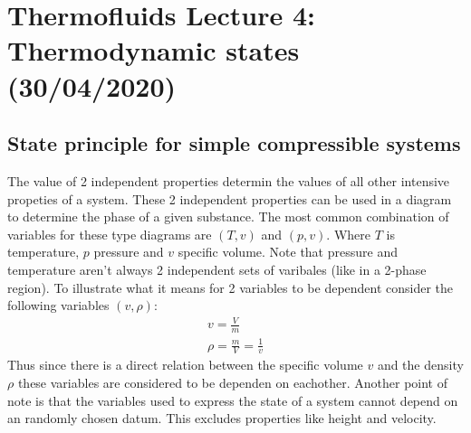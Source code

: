 \documentclass[11pt, a4paper]{article}
\begin{document}
\setcounter{section}{3}
\setcounter{equation}{0}
\section{Thermofluids Lecture 4: Thermodynamic states (30/04/2020)}


\subsection{State principle for simple compressible systems}
The value of 2 independent properties determin the values of all other intensive propeties of a system. These 2 independent properties can be used in a diagram to determine the phase of a given substance. The most common combination of variables for these type diagrams are $(T, v)$ and $(p, v)$. Where $T$ is temperature, $p$ pressure and $v$ specific volume. Note that pressure and temperature aren't always 2 independent sets of varibales (like in a 2-phase region). To illustrate what it means for 2 variables to be dependent consider the following variables $(v, \rho)$:
\begin{gather}
  v = \frac{V}{m}\\
  \rho = \frac{m}{V} = \frac{1}{v}
\end{gather}
Thus since there is a direct relation between the specific volume $v$ and the density $\rho$ these variables are considered to be dependen on eachother. Another point of note is that the variables used to express the state of a system cannot depend on an randomly chosen datum. This excludes properties like height and velocity.
\end{document}
